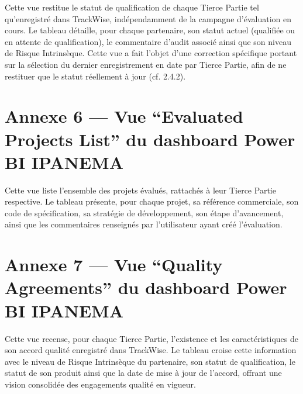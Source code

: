 Cette vue restitue le statut de qualification de chaque Tierce Partie tel qu'enregistré
dans TrackWise, indépendamment de la campagne d'évaluation en cours. Le tableau
détaille, pour chaque partenaire, son statut actuel (qualifiée ou en attente de qualification), le
commentaire d'audit associé ainsi que son niveau de Risque Intrinsèque. Cette vue a fait
l'objet d'une correction spécifique portant sur la sélection du dernier enregistrement en date
par Tierce Partie, afin de ne restituer que le statut réellement à jour (cf. 2.4.2).

\begin{figure}[H]
    \centering
    \label{fig:annexe5_tp_qualification_status}
\end{figure}

\section*{Annexe 6 — Vue ``Evaluated Projects List'' du dashboard Power BI IPANEMA}

Cette vue liste l'ensemble des projets évalués, rattachés à leur Tierce Partie
respective. Le tableau présente, pour chaque projet, sa référence commerciale, son code de
spécification, sa stratégie de développement, son étape d'avancement, ainsi que les
commentaires renseignés par l'utilisateur ayant créé l'évaluation.

\begin{figure}[H]
    \centering
    \label{fig:annexe6_evaluated_projects_list}
\end{figure}

\section*{Annexe 7 — Vue ``Quality Agreements'' du dashboard Power BI IPANEMA}

Cette vue recense, pour chaque Tierce Partie, l'existence et les caractéristiques de
son accord qualité enregistré dans TrackWise. Le tableau croise cette information avec le
niveau de Risque Intrinsèque du partenaire, son statut de qualification, le statut de son
produit ainsi que la date de mise à jour de l'accord, offrant une vision consolidée des
engagements qualité en vigueur.

